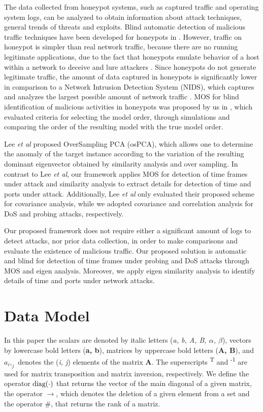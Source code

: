 \documentclass{bmcart}
\begin{document}
The data collected from honeypot systems, such as captured traffic and operating system logs, can be analyzed to obtain information about attack techniques, general trends of threats and exploits. Blind automatic detection of malicious traffic techniques have been developed for honeypots in \cite{david2011blind,da2012improved}. However, traffic on honeypot is simpler than real network traffic, because there are no running legitimate applications, due to the fact that honeypots emulate behavior of a host within a network to deceive and lure attackers \cite{zakaria2012review}. Since honeypots do not generate legitimate traffic, the amount of data captured in honeypots is significantly lower in comparison to a Network Intrusion Detection System (NIDS), which captures and analyzes the largest possible amount of network traffic \cite{david2011blind}. MOS for blind identification of malicious activities in honeypots was proposed by us in \cite{david2011blind}, which evaluated criteria for selecting the model order, through simulations and comparing the order of the resulting model with the true model order.

Lee \emph{et al} \cite{Lee2013} proposed OverSampling PCA (osPCA), which allows one to determine the anomaly of the target instance according to the variation of the resulting dominant eigenvector obtained by similarity analysis and over sampling. In contrast to Lee \emph{et al}, our framework applies MOS for detection of time frames under attack and similarity analysis to extract details for detection of time and ports under attack. Additionally, Lee \emph{et al} only evaluated their proposed scheme for covariance analysis, while we adopted covariance and correlation analysis for DoS and probing attacks, respectively.

Our proposed framework does not require either a significant amount of logs to detect attacks, nor prior data collection, in order to make comparisons and evaluate the existence of malicious traffic. Our proposed solution is automatic and blind for detection of time frames under probing and DoS attacks through MOS and eigen analysis. Moreover, we apply eigen similarity analysis to identify details of time and ports under network attacks.


\section{Data Model}
\label{sec:datamodel}

In this paper the scalars are denoted by italic letters (\emph{a, b, A, B, $α$, $β$}), vectors by lowercase bold letters (\textbf{a, b}), matrices by uppercase bold letters (\textbf{A, B}), and $a_i,_j$ denotes the (\emph{i, j}) elements of the matrix \textbf{A}. The superscripts \textsuperscript{T} and \textsuperscript{-1} are used for matrix transposition and matrix inversion, respectively. We define the operator $\rm diag(\cdot)$ that returns the vector of the main diagonal of a given matrix, the operator $\rightarrow$, which denotes the deletion of a given element from a set and the operator $\#$, that returns the rank of a matriz.
\end{document}
